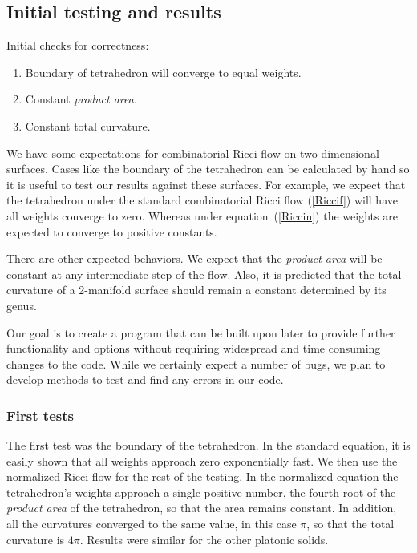 \documentclass[12pt]{article}
\begin{document}
\subsection{Initial testing and results}

 Initial checks for correctness:
\begin{enumerate}
\item Boundary of tetrahedron will converge to equal weights.
\item Constant \textit{product area}.
\item Constant total curvature.
\end{enumerate}

We have some expectations for combinatorial Ricci flow on two-dimensional surfaces. Cases like the boundary of the tetrahedron can be calculated by hand so it is useful to test our results against these surfaces. For example, we expect that the tetrahedron under the standard combinatorial Ricci flow (\ref{Riccif}) will have all weights converge to zero. Whereas under equation~(\ref{Riccin}) the weights are expected to converge to positive constants.

 There are other expected behaviors. We expect that the \textit{product area} will be constant at any intermediate step of the flow. Also, it is predicted that the total curvature of a 2-manifold surface should remain a constant determined by its genus.

 Our goal is to create a program that can be built upon later to provide further functionality and options without requiring widespread and time consuming changes to the code. While we certainly expect a number of bugs, we plan to develop methods to test and find any errors in our code. 

\subsubsection{First tests}
\label{InitialResults}
The first test was the boundary of the tetrahedron. In the standard equation, it is easily shown that all weights approach zero exponentially fast. We then use the normalized Ricci flow for the rest of the testing. In the normalized equation the tetrahedron's weights approach a single positive number, the fourth root of the \textit{product area} of the tetrahedron, so that the area remains constant. In addition, all the curvatures converged to the same value, in this case $\pi$, so that the total curvature is $4\pi$. Results were similar for the other platonic solids.
\end{document}

